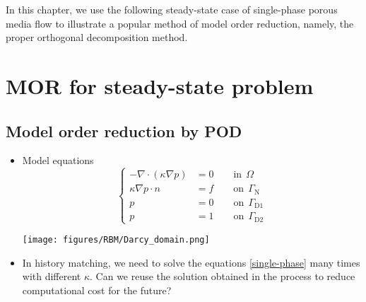 
In this chapter, we use the following steady-state case of single-phase porous media flow to 
illustrate a popular method of model order reduction, namely, the proper orthogonal decomposition 
method.
\section{MOR for steady-state problem}
\subsection{Model order reduction by POD}
\begin{itemize}
\item Model equations
\begin{equation} \label{single-phase}
\left\{
\begin{aligned}
- \nabla \cdot (\kappa \nabla p) & = 0  \qquad \text{in}~~ \Omega \\
\kappa \nabla p \cdot n &= f \qquad \text{on} ~~ \Gamma_\text{N} \\
p  &= 0 \qquad \text{on} ~~\Gamma_{\text{D}1} \\
p  &= 1 \qquad \text{on}~~ \Gamma_{\text{D}2} 
\end{aligned}
\right. 
\end{equation}
\begin{center}
\texttt{[image: figures/RBM/Darcy\_domain.png]}
\end{center}
\item In history matching, we need to solve the equations \eqref{single-phase} many times with different $\kappa$. Can we reuse the solution obtained in the process to reduce computational cost for the future?
\end{itemize}

